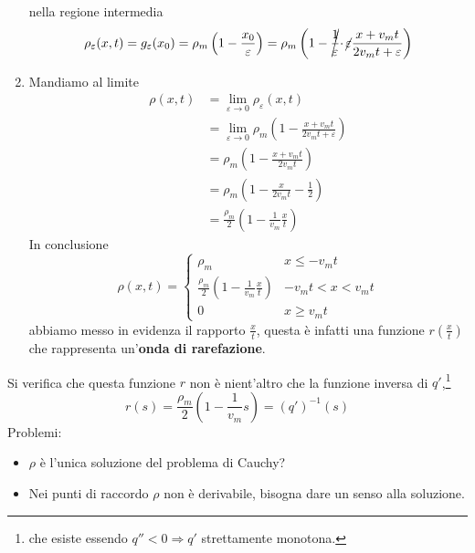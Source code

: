 \documentclass[10pt,a4paper,twoside,openright]{book}
\begin{document}
\begin{enumerate}
	      
	      nella regione intermedia
	      \begin{equation*}
	      	\rho _{\varepsilon }(x,t) =g_{\varepsilon }(x_{0}) =\rho _{m}\left(1-\frac{x_{0}}{\varepsilon }\right) =\rho _{m}\left(1-\cancel{\frac{1}{\varepsilon }} \cdotp \cancel{\varepsilon }\frac{x+v_{m} t}{2v_{m} t+\varepsilon }\right)
	      \end{equation*}
	\item Mandiamo al limite
	      \begin{align*}
	      	\rho (x,t) & =\lim _{\varepsilon \rightarrow 0} \rho _{\varepsilon }(x,t)                                       \\
	      	            & =\lim _{\varepsilon \rightarrow 0} \rho _{m}\left(1-\frac{x+v_{m} t}{2v_{m} t+\varepsilon }\right) \\
	      	            & =\rho _{m}\left(1-\frac{x+v_{m} t}{2v_{m} t}\right)                                                \\
	      	            & =\rho _{m}\left(1-\frac{x}{2v_{m} t} -\frac{1}{2}\right)                                           \\
	      	            & =\frac{\rho _{m}}{2}\left(1-\frac{1}{v_{m}}\frac{x}{t}\right)                                      
	      \end{align*}
	      In conclusione
	      \begin{equation*}
	      	\rho (x,t) = \begin{cases}
	      		\rho _{m} & x\le -v_{m}t\\
	      		\frac{\rho _{m}}{2}\left(1-\frac{1}{v_{m}}\frac{x}{t} \right) & -v_{m}t < x < v_{m}t\\
	      		0 & x\geq v_{m}t 
	      	\end{cases}
	      \end{equation*}
	      abbiamo messo in evidenza il rapporto $\frac{x}{t}$, questa è infatti una funzione $r\left(\frac{x}{t}\right)$ che rappresenta un'\textbf{onda di rarefazione}.
\end{enumerate}


Si verifica che questa funzione $r$ non è nient'altro che la funzione inversa di $q'$,\footnote{che esiste essendo $q''< 0\Rightarrow q'$ strettamente monotona.}
\begin{equation*}
	r(s) =\frac{\rho _{m}}{2}\left(1-\frac{1}{v_{m}} s\right) =(q')^{-1}(s)
\end{equation*}
Problemi:
\begin{itemize}
	\item $\rho $ è l'unica soluzione del problema di Cauchy?
	\item Nei punti di raccordo $\rho $ non è derivabile, bisogna dare un senso alla soluzione.
\end{itemize}
\end{document}
